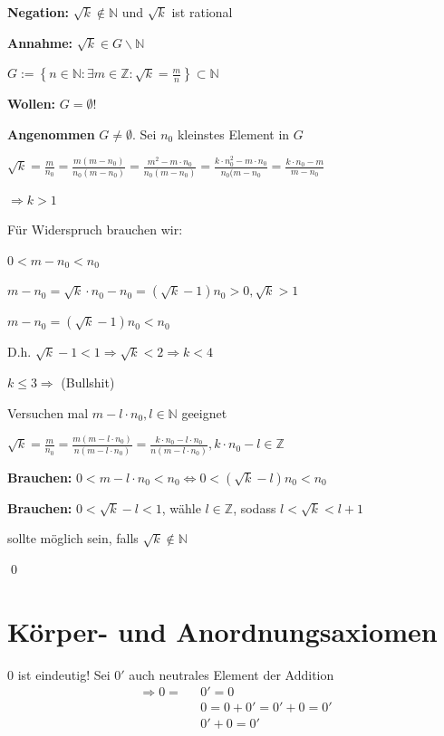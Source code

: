 \documentclass[fleqn]{scrbook}
\newcommand{\N}{\mathbb{N}}
\renewenvironment{proof}{{\bfseries Beweis }}{\qed}
\newenvironment{example}{{\bfseries Beispiel }}{}
\begin{document}
\begin{proof}

\textbf{Negation:} $\sqrt{k} \notin \N$ und $\sqrt{k}$ ist rational

\textbf{Annahme:} $\sqrt{k} \in G \backslash \N$

$G:=\left\{ n \in \N: \exists m \in \mathbb{Z}: \sqrt{k} = \frac{m}{n} \right\} \subset \N$

\textbf{Wollen:} $G = \emptyset$!

\textbf{Angenommen} $G \neq \emptyset$. Sei $n_0$ kleinstes Element in $G$

$\sqrt{k} = \frac{m}{n_0} = \frac{m(m-n_0)}{n_0(m-n_0)} = \frac{m^2-m \cdot n_0}{n_0(m-n_0)} = \frac{k \cdot n_0^2-m \cdot n_0}{n_0(m-n_0} = \frac{k \cdot n_0-m}{m-n_0}$ 

$\Longrightarrow k>1$

Für Widerspruch brauchen wir:

$0<m-n_0<n_0$

$m-n_0 = \sqrt{k} \cdot n_0-n_0=(\sqrt{k}-1)n_0>0,\sqrt{k}>1$ 

$m-n_0 = (\sqrt{k}-1)n_0 < n_0$

D.h. $\sqrt{k} -1<1 \Longrightarrow \sqrt{k}<2 \Longrightarrow k<4$

$k \leq 3 \Longrightarrow $ (Bullshit)

Versuchen mal $m-l \cdot n_0,l \in \N$ geeignet

$\sqrt{k} = \frac{m}{n_0} = \frac{m(m-l \cdot n_0)}{n(m-l \cdot n_0)} = \frac{k \cdot n_0-l \cdot n_0}{n(m-l \cdot n_0)}, k \cdot n_0-l \in \mathbb{Z}$

\textbf{Brauchen:}  $0<m-l \cdot n_0<n_0 \Longleftrightarrow 0<(\sqrt{k}-l)n_0<n_0$ 

\textbf{Brauchen:}  $0<\sqrt{k}-l<1$, wähle $l \in \mathbb{Z}$, sodass $l < \sqrt{k}<l+1$

sollte möglich sein, falls $\sqrt{k} \notin \N$ 

\end{proof}

\section{Körper- und Anordnungsaxiomen}
  \begin{example}
    $0$ ist eindeutig!
    Sei $0'$ auch neutrales Element der Addition
    \begin{align*}
      \Longrightarrow 0 = \text{ }& 0' = 0\\
                      & 0  = 0+0'=0'+0=0'\\
                      & 0' + 0=0'
    \end{align*}
  \end{example}
\end{document}
